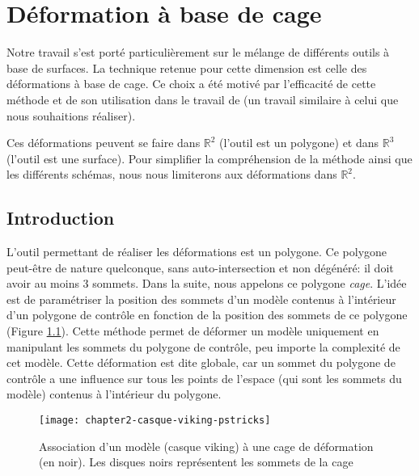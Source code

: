 

\chapter{Déformation à base de cage}

\graphicspath{ {Chapter2/Chapter2Figs/PNG/}
  {Chapter2/Chapter2Figs/PDF/} {Chapter2/Chapter2Figs/} }

Notre travail s'est porté particulièrement sur le mélange de différents outils
à base de surfaces. La technique retenue pour cette dimension est celle
des déformations à base de cage. Ce choix a été motivé par l'efficacité de
cette méthode et de son utilisation dans le travail de \cite{GPCP13} (un
travail similaire à celui que nous souhaitions réaliser).

Ces déformations peuvent se faire dans $\mathbb{R}^2$ (l'outil
est un polygone) et dans $\mathbb{R}^3$ (l'outil est une surface). Pour
simplifier la compréhension de la méthode ainsi que les différents schémas,
nous nous limiterons aux déformations dans $\mathbb{R}^2$.

\section{Introduction} 

L'outil permettant de réaliser les déformations est un polygone. Ce polygone
peut-être de nature quelconque, sans auto-intersection et non dégénéré: il
doit avoir au moins 3 sommets. Dans la suite, nous appelons ce polygone
\textit{cage}. L'idée est de paramétriser la position des sommets d'un modèle
contenus à l'intérieur d'un polygone de contrôle en fonction de la position
des sommets de ce polygone (Figure \ref{DEFMod}). Cette méthode permet de
déformer un modèle uniquement en manipulant les sommets du polygone de
contrôle, peu importe la complexité de cet modèle. Cette déformation est dite
globale, car un sommet du polygone de contrôle a une influence sur tous les
points de l'espace (qui sont les sommets du modèle) contenus à l'intérieur du
polygone.

\begin{figure}[ht]
\begin{center}
\texttt{[image: chapter2-casque-viking-pstricks]}

\caption[Association d'un modèle à une cage] {Association d'un modèle (casque
viking) à une cage de déformation (en noir). Les disques noirs représentent
les sommets de la cage}

\label{DEFMod}
\end{center}
\end{figure}

